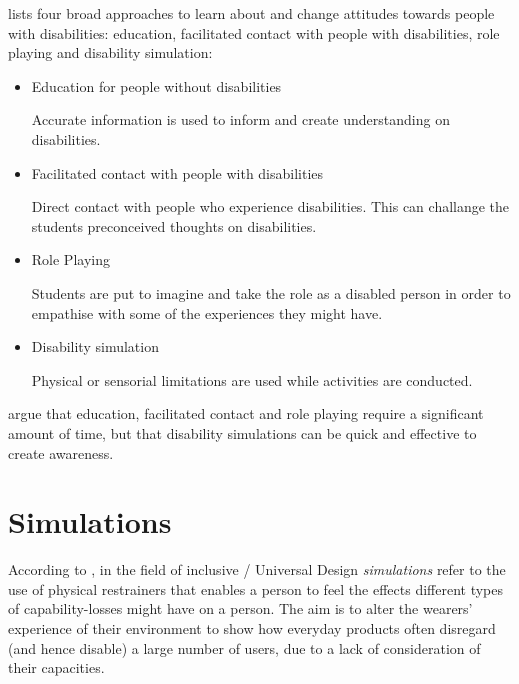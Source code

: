 \textcite{Jordan2010} lists four broad approaches to learn about and change attitudes towards people with disabilities: education, facilitated contact with people with disabilities, role playing and disability simulation: 
\begin{itemize}
    \item Education for people without disabilities
    
    Accurate information is used to inform and create understanding on disabilities.
    \item Facilitated contact with people with disabilities
    
    Direct contact with people who experience disabilities. This can challange the students preconceived thoughts on disabilities. 
    \item Role Playing
    
    Students are put to imagine and take the role as a disabled person in order to empathise with some of the experiences they might have.
    \item Disability simulation
    
    Physical or sensorial limitations are used while activities are conducted.
\end{itemize}

\textcite{Jordan2010} argue that education, facilitated contact and role playing require a significant amount of time, but that disability simulations can be quick and effective to create awareness.
\section{Simulations}
According to \textcite{Cardoso2012}, in the field of inclusive / Universal Design \textit{simulations} refer to the use of physical restrainers that enables a person to feel the effects different types of capability-losses might have on a person. The aim is to alter the wearers’ experience of their environment to show how everyday products often disregard (and hence disable) a large number of users, due to a lack of consideration of their capacities.

